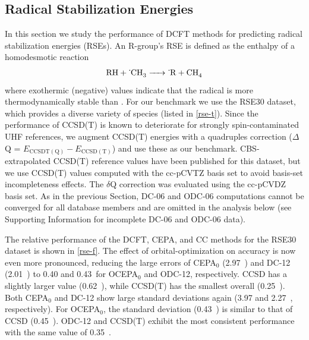 \subsection{Radical Stabilization Energies}


In this section we study the performance of DCFT methods for predicting radical
stabilization energies (RSEs). An R-group's RSE is defined as the enthalpy of a
homodesmotic reaction
\begin{equation}
    \ce{%
        RH
        +
        {}^.CH3
        ->
        {}^.R
        +
        CH4
    }
\end{equation}
where exothermic (negative) values indicate that the radical  is more
thermodynamically stable than .\cite{Zipse:2006p163}
For our benchmark we use the RSE30 dataset\cite{Soydas:2013p1452}, which
provides a diverse variety of  species (listed in \cref{rse-t}).
Since the performance of CCSD(T) is known to deteriorate for strongly
spin-contaminated UHF
references,\cite{Byrd:2001p9736,Beran:2003p2488,Lochan:2007p164101,Kurlancheek:2009p1223,Bozkaya:2011p224103}
we augment CCSD(T) energies with a quadruples correction ($\Delta$Q  =
$E_\mathrm{CCSDT(Q)}-E_\mathrm{CCSD(T)}$) and use these as our benchmark.
CBS-extrapolated CCSD(T) reference values have been published for this
dataset,\cite{Soydas:2014p1073} but we use CCSD(T) values computed with the
cc-pCVTZ basis set to avoid basis-set incompleteness effects. 
The $\delta$Q correction was evaluated using the cc-pCVDZ basis set. 
As in the previous Section, DC-06 and ODC-06 computations cannot be converged
for all database members and are omitted in the analysis below (see Supporting
Information for incomplete DC-06 and ODC-06 data).


The relative performance of the DCFT, CEPA, and CC methods for the RSE30 dataset
is shown in \cref{rse-f}.
The effect of orbital-optimization on accuracy is now even more pronounced,
reducing the large \mae errors of CEPA$_0$ (2.97~\kcal) and DC-12 (2.01~\kcal)
to 0.40 and 0.43~\kcal for OCEPA$_0$ and ODC-12, respectively. CCSD has a
slightly larger \mae value (0.62~\kcal), while CCSD(T) has the smallest overall
\mae (0.25~\kcal).
Both CEPA$_0$ and DC-12 show large standard deviations again (3.97 and
2.27~\kcal, respectively).
For OCEPA$_0$, the standard deviation (0.43~\kcal) is similar to that of CCSD
(0.45~\kcal). ODC-12 and CCSD(T) exhibit the most consistent performance with
the same \std value of 0.35~\kcal.

